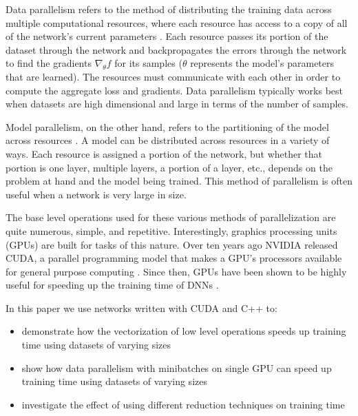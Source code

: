 \documentclass[11pt,a4paper]{article}
\begin{document}
Data parallelism refers to the method of distributing the training data across multiple computational resources, where each resource has access to a copy of all of the network's current parameters \cite{beyond_data_model_parallelism}. Each resource passes its portion of the dataset through the network and backpropagates the errors through the network to find the gradients $\nabla_{\theta}f$ for its samples ($\theta$ represents the model's parameters that are learned). The resources must communicate with each other in order to compute the aggregate loss and gradients. Data parallelism typically works best when datasets are high dimensional and large in terms of the number of samples.

Model parallelism, on the other hand, refers to the partitioning of the model across resources \cite{beyond_data_model_parallelism}. A model can be distributed across resources in a variety of ways. Each resource is assigned a portion of the network, but whether that portion is one layer, multiple layers, a portion of a layer, etc., depends on the problem at hand and the model being trained. This method of parallelism is often useful when a network is very large in size.

The base level operations used for these various methods of parallelization are quite numerous, simple, and repetitive. Interestingly, graphics processing units (GPUs) are built for tasks of this nature. Over ten years ago NVIDIA released CUDA, a parallel programming model that makes a GPU's processors available for general purpose computing \cite{cuda}. Since then, GPUs have been shown to be highly useful for speeding up the training time of DNNs \cite{dl_using_gpus, dl_using_gpus2}. 

In this paper we use networks written with CUDA and C++ to:
\begin{itemize}
    \item demonstrate how the vectorization of low level operations speeds up training time using datasets of varying sizes
    \item show how data parallelism with minibatches on single GPU can speed up training time using datasets of varying sizes
    \item investigate the effect of using different reduction techniques on training time
\end{itemize}

\end{document}
